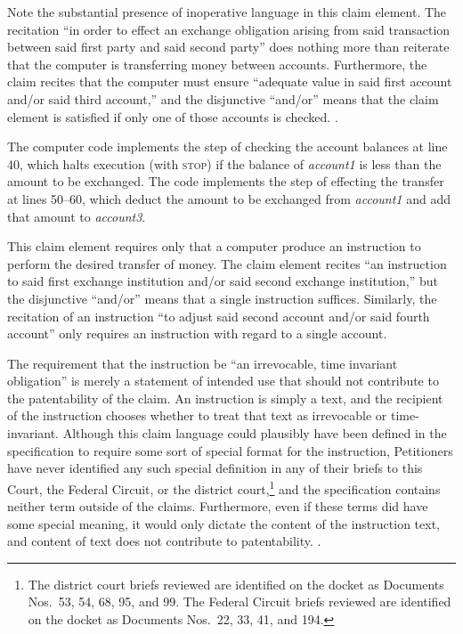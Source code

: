 \documentclass{scotus}
\begin{document}
Note the substantial presence of inoperative language in this claim element. The
recitation ``in order to effect an exchange obligation arising from said
transaction between said first party and said second party'' does nothing more
than reiterate that the computer is transferring money between accounts.
Furthermore, the claim recites that the computer must ensure ``adequate value in
said first account and/or said third account,'' and the disjunctive ``and/or''
means that the claim element is satisfied if only one of those accounts is
checked. .

The computer code implements the step of checking the account balances at line
40, which halts execution (with \textsc{stop}) if the balance of
\emph{account1} is less than the amount to be exchanged. The code implements the
step of effecting the transfer at lines 50--60, which deduct the amount to be
exchanged from \emph{account1} and add that amount to \emph{account3}.


This claim element requires only that a computer produce an instruction to
perform the desired transfer of money. The claim element recites ``an
instruction to said first exchange institution and/or said second exchange
institution,'' but the disjunctive ``and/or'' means that a single instruction
suffices. Similarly, the recitation of an instruction ``to adjust said second
account and/or said fourth account'' only requires an instruction with regard to
a single account.

The requirement that the instruction be ``an irrevocable, time invariant
obligation'' is merely a statement of intended use that should not contribute to
the patentability of the claim. An instruction is simply a text, and the
recipient of the instruction chooses whether to treat that text as irrevocable
or time-invariant. Although this claim language could plausibly have been
defined in the specification to require some sort of special format for the
instruction, Petitioners have never identified any such special definition in
any of their briefs to this Court, the Federal Circuit, or the district
court,\footnote{The district court briefs reviewed are identified on the docket
as Documents Nos.\ 53, 54, 68, 95, and 99. The Federal Circuit briefs reviewed
are identified on the docket as Documents Nos.\ 22, 33, 41, and 194.}
and the
specification contains neither term outside of the claims. Furthermore, even if
these terms did have some special meaning, it would only dictate the content of
the instruction text, and content of text does not contribute to patentability.
.
\end{document}
